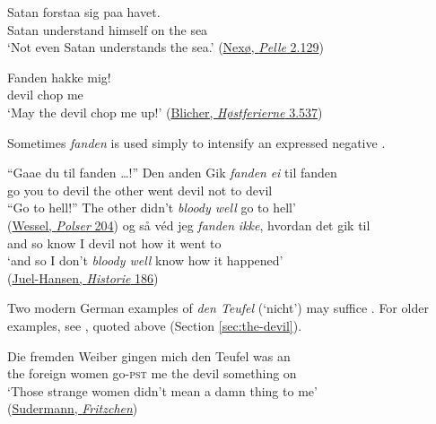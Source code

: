 \ex
\gll Satan forstaa sig paa havet.\\
 Satan understand himself on {the sea}\\
\glt `Not even Satan understands the sea.'
\hfill(\href{https://www.kb.dk/e-mat/dod/130004856751-bw.pdf}{Nexø, \textit{Pelle} 2.129})
\z
\z

\ea \label{ex:04-blicher-h}
\gll Fanden hakke mig! \\
 devil chop me \\
\glt `May the devil chop me up!'
\hfill(\href{https://books.google.co.jp/books?id=Y3wOAAAAYAAJ&hl=ja&pg=PA537#v=onepage&q=fanden&f=false}{Blicher, \textit{Høstferierne} 3.537})
\z

Sometimes \textit{fanden} is used simply to intensify an expressed negative .

\ea \label{ex:04-224}
\ea
\gll ``Gaae du til {fanden {\dots}!''} Den anden Gik \textit{fanden} \textit{ei} til fanden\\
 go you to devil the other went devil not to devil\\
\glt ``Go to hell!'' The other didn't \textit{bloody well} go to hell'
\\\hfill(\href{https://books.google.co.jp/books?newbks=1&newbks_redir=0&hl=ja&id=9_-Z9j0M3z8C&dq=\%22ki%C3%B8rte+pokker%22+wessel&q=Gaae+du+til+fanden#v=snippet&q=\%22Gaae%20du%20til%20fanden\%22&f=false}{Wessel, \textit{Polser} 204}) %
\ex{}
\gll og så véd jeg \textit{fanden} \textit{ikke}, hvordan det gik til\\
 and so know I devil not how it went to\\
\glt `and so I don't \textit{bloody well} know how it happened'
\\\hfill(\href{https://tekster.kb.dk/text/adl-texts-juelh01val-root#s186}{Juel-Hansen, \textit{Historie} 186}) %
\z
\z{}

\label{para:negativesbefore}Two modern German examples of \textit{den Teufel} (`nicht') may suffice . For older examples, see \citet{grimm1856uber}, quoted above (Section \ref{sec:the-devil}).

\ea \label{ex:04-226}
\ea
\gll Die fremden Weiber gingen mich den Teufel was an\\
 the foreign women go-\textsc{pst} me the devil something on\\
\glt `Those strange women didn't mean a damn thing to me'
\\\hfill(\href{https://archive.org/details/moriturifritzch00sudegoog/page/n109/mode/2up?q=\%22+Sie+ftemben+%C3%A4Beibet+gingen+micg+ba+ben+Xeufel+toas+an.\%22&view=theater}{Sudermann, \textit{Fritzchen}})

